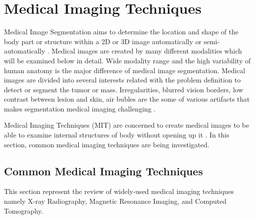 \section{Medical Imaging Techniques}

    Medical Image Segmentation aims to determine the location and shape of the body part or structure within a 2D or 3D image automatically or semi-automatically \cite{merjulah2019classification}.
    Medical images are created by many different modalities which will be examined below in detail.
    Wide modality range and the high variability of human anatomy is the major difference of medical image segmentation.
    Medical images are divided into several interests related with the problem definition to detect or segment the tumor or mass.
    Irregularities, blurred vision borders, low contrast between lesion and skin, air bubles are the some of various artifacts that makes segmentation medical imaging challenging \cite{guo2019neutrosophic}.

    Medical Imaging Techniques (MIT) are concerned to create medical images to be able to examine internal structures of body without opening up it \cite{kasban2015comparative}.
    In this section, common medical imaging techniques are being investigated.

    \subsection{Common Medical Imaging Techniques}

        

        This section represent the review of widely-used medical imaging techniques namely X-ray Radiography, Magnetic Resonance Imaging, and Computed Tomography.

